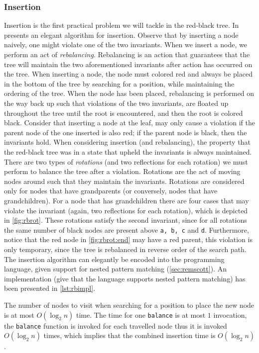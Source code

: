 \subsubsection{Insertion}
Insertion is the first practical problem we will tackle in the red-black tree.
In~\cite{okasaki1999red} presents an elegant algorithm for insertion.
Observe that by inserting a node naively, one might violate one of the two invariants.
When we insert a node, we perform an act of \textit{rebalancing}.
Rebalancing is an action that guarantees that the tree will maintain the two aforementioned invariants after action has occurred on the tree.
When inserting a node, the node must colored red and always be placed in the bottom of the tree by searching for a position, while maintaining the ordering of the tree.
When the node has been placed, rebalancing is performed on the way back up such that violations of the two invariants, are floated up throughout the tree until the root is encountered, and then the root is colored black.
Consider that inserting a node at the leaf, may only cause a violation if the parent node of the one inserted is also red; if the parent node is black, then the invariants hold.
When considering insertion (and rebalancing), the property that the red-black tree was in a state that upheld the invariants is always maintained.
There are two types of \textit{rotations} (and two reflections for each rotation) we must perform to balance the tree after a violation.
Rotations are the act of moving nodes around such that they maintain the invariants.
Rotations are considered only for nodes that have grandparents (or conversely, nodes that have grandchildren).
For a node that has grandchildren there are four cases that may violate the invariant (again, two reflections for each rotation), which is depicted in \autoref{fig:rbrot}.
These rotations satisfy the second invariant, since for all rotations the same number of black nodes are present above \texttt{a, b, c} and \texttt{d}.
Furthermore, notice that the red node in \autoref{fig:rbrot:end} may have a red parent, this violation is only temporary, since the tree is rebalanced in reverse order of the search path.
The insertion algorithm can elegantly be encoded into the programming language, given support for nested pattern matching (\autoref{sec:remscott}).
An implementation (give that the language supports nested pattern matching) has been presented in \autoref{lst:rbimpl}.

The number of nodes to visit when searching for a position to place the new node is at most $O(\log_2 n)$ time.
The time for one \texttt{balance} is at most $1$ invocation, the \texttt{balance} function is invoked for each travelled node thus it is invoked $O(\log_2 n)$ times, which implies that the combined insertion time is $O(\log_2 n)$.

